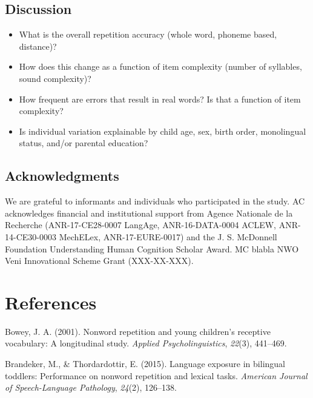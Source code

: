 \documentclass[english,,man,floatsintext]{apa6}
\providecommand{\tightlist}{%
  \setlength{\itemsep}{0pt}\setlength{\parskip}{0pt}}
\begin{document}
\hypertarget{discussion}{%
\subsection{Discussion}\label{discussion}}

\begin{itemize}
\tightlist
\item
  What is the overall repetition accuracy (whole word, phoneme based, distance)?
\item
  How does this change as a function of item complexity (number of syllables, sound complexity)?
\item
  How frequent are errors that result in real words? Is that a function of item complexity?
\item
  Is individual variation explainable by child age, sex, birth order, monolingual status, and/or parental education?
\end{itemize}

\newpage

\hypertarget{acknowledgments}{%
\subsection{Acknowledgments}\label{acknowledgments}}

We are grateful to informants and individuals who participated in the study. AC acknowledges financial and institutional support from Agence Nationale de la Recherche (ANR-17-CE28-0007 LangAge, ANR-16-DATA-0004 ACLEW, ANR-14-CE30-0003 MechELex, ANR-17-EURE-0017) and the J. S. McDonnell Foundation Understanding Human Cognition Scholar Award. MC blabla NWO Veni Innovational Scheme Grant (XXX-XX-XXX).

\hypertarget{references}{%
\section{References}\label{references}}

\setlength{\parindent}{-0.5in}
\setlength{\leftskip}{0.5in}

\hypertarget{refs}{}
\leavevmode\hypertarget{ref-bowey2001nonword}{}%
Bowey, J. A. (2001). Nonword repetition and young children's receptive vocabulary: A longitudinal study. \emph{Applied Psycholinguistics}, \emph{22}(3), 441--469.

\leavevmode\hypertarget{ref-brandeker2015language}{}%
Brandeker, M., \& Thordardottir, E. (2015). Language exposure in bilingual toddlers: Performance on nonword repetition and lexical tasks. \emph{American Journal of Speech-Language Pathology}, \emph{24}(2), 126--138.
\end{document}
